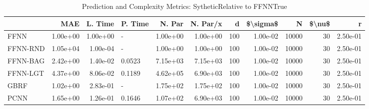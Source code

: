 \begin{table}
\centering
\caption{Prediction and Complexity Metrics: SytheticRelative to FFNNTrue}
\label{tab__Sythetic__Fix_Neurons_QTrue}
\begin{tabular}{lrrlrrrrrrr}
\toprule
{} &      MAE &  L. Time & P. Time &   N. Par &  N. Par/x &    d &  \$\textbackslash sigma\$ &      N &  \$\textbackslash nu\$ &        r \\
\midrule
FFNN     & 1.00e+00 & 1.00e+00 &       - & 1.00e+00 &  1.00e+00 &  100 &  1.00e-02 &  10000 &     30 & 2.50e-01 \\
FFNN-RND & 1.05e+04 & 1.00e-04 &       - & 1.00e+00 &  1.00e+00 &  100 &  1.00e-02 &  10000 &     30 & 2.50e-01 \\
FFNN-BAG & 2.42e+00 & 1.40e-02 &  0.0523 & 7.15e+03 &  7.15e+03 &  100 &  1.00e-02 &  10000 &     30 & 2.50e-01 \\
FFNN-LGT & 4.37e+00 & 8.06e-02 &  0.1189 & 4.62e+05 &  6.90e+03 &  100 &  1.00e-02 &  10000 &     30 & 2.50e-01 \\
GBRF     & 1.02e+00 & 2.83e-01 &       - & 1.75e+02 &  1.75e+02 &  100 &  1.00e-02 &  10000 &     30 & 2.50e-01 \\
PCNN     & 1.65e+00 & 1.26e-01 &  0.1646 & 1.07e+02 &  6.90e+03 &  100 &  1.00e-02 &  10000 &     30 & 2.50e-01 \\
\bottomrule
\end{tabular}
\end{table}
